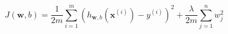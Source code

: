 \documentclass{article}
\begin{document}
\[ %
J(\mathbf{w}, b) = \frac{1}{2m} \sum_{i=1}^{m} \left( h_{\mathbf{w}, b}(\mathbf{x}^{(i)}) - y^{(i)} \right)^2 + \frac{\lambda}{2m} \sum_{j=1}^{n} w_j^2
\]
\end{document}

